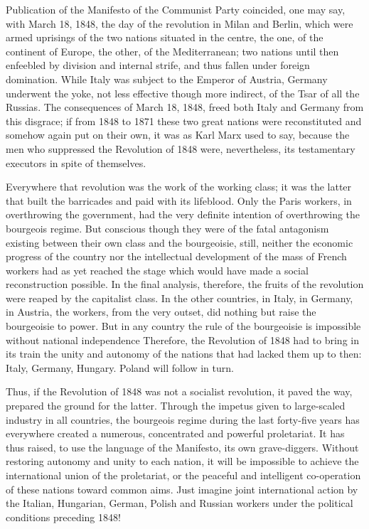 Publication of the Manifesto of the Communist Party coincided, one may say, with March 18, 1848, the day of the revolution in Milan and Berlin, which were armed uprisings of the two nations situated in the centre, the one, of the continent of Europe, the other, of the Mediterranean; two nations until then enfeebled by division and internal strife, and thus fallen under foreign domination. While Italy was subject to the Emperor of Austria, Germany underwent the yoke, not less effective though more indirect, of the Tsar of all the Russias. The consequences of March 18, 1848, freed both Italy and Germany from this disgrace; if from 1848 to 1871 these two great nations were reconstituted and somehow again put on their own, it was as Karl Marx used to say, because the men who suppressed the Revolution of 1848 were, nevertheless, its testamentary executors in spite of themselves.

Everywhere that revolution was the work of the working class; it was the latter that built the barricades and paid with its lifeblood. Only the Paris workers, in overthrowing the government, had the very definite intention of overthrowing the bourgeois regime. But conscious though they were of the fatal antagonism existing between their own class and the bourgeoisie, still, neither the economic progress of the country nor the intellectual development of the mass of French workers had as yet reached the stage which would have made a social reconstruction possible. In the final analysis, therefore, the fruits of the revolution were reaped by the capitalist class. In the other countries, in Italy, in Germany, in Austria, the workers, from the very outset, did nothing but raise the bourgeoisie to power. But in any country the rule of the bourgeoisie is impossible without national independence Therefore, the Revolution of 1848 had to bring in its train the unity and autonomy of the nations that had lacked them up to then: Italy, Germany, Hungary. Poland will follow in turn.

Thus, if the Revolution of 1848 was not a socialist revolution, it paved the way, prepared the ground for the latter. Through the impetus given to large-scaled industry in all countries, the bourgeois regime during the last forty-five years has everywhere created a numerous, concentrated and powerful proletariat. It has thus raised, to use the language of the Manifesto, its own grave-diggers. Without restoring autonomy and unity to each nation, it will be impossible to achieve the international union of the proletariat, or the peaceful and intelligent co-operation of these nations toward common aims. Just imagine joint international action by the Italian, Hungarian, German, Polish and Russian workers under the political conditions preceding 1848!

